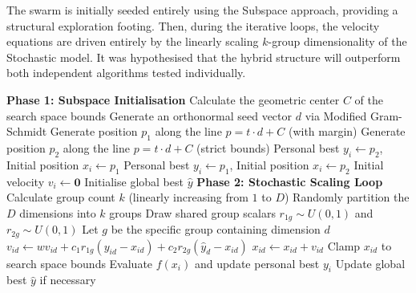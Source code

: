 \documentclass[conference]{IEEEtran}
\begin{document}
    The swarm is initially seeded entirely using the Subspace approach, providing a structural exploration footing. Then, during the iterative 
    loops, the velocity equations are driven entirely by the linearly scaling $k$-group dimensionality of the Stochastic model. It was hypothesised that 
    the hybrid structure will outperform both independent algorithms tested individually. 

    \begin{algorithm}
    \caption{Hybrid Particle Swarm Optimisation (Subspace Initialisation + Stochastic Scaling)}
    \label{alg:hybrid_pso}
    \begin{algorithmic}[1]
    \STATE \textbf{Phase 1: Subspace Initialisation}
    \STATE Calculate the geometric center $C$ of the search space bounds
    \STATE Generate an orthonormal seed vector $d$ via Modified Gram-Schmidt
        \STATE Generate position $p_1$ along the line $p = t \cdot d + C$ (with margin)
        \STATE Generate position $p_2$ along the line $p = t \cdot d + C$ (strict bounds)
            \STATE Personal best $y_i \gets p_2$, Initial position $x_i \gets p_1$
        \ELSE
            \STATE Personal best $y_i \gets p_1$, Initial position $x_i \gets p_2$
        \ENDIF
        \STATE Initial velocity $v_i \gets \mathbf{0}$ 
    \ENDFOR
    \STATE Initialise global best $\hat{y}$
    \STATE
    \STATE \textbf{Phase 2: Stochastic Scaling Loop}
        \STATE Calculate group count $k$ (linearly increasing from $1$ to $D$)
        \STATE Randomly partition the $D$ dimensions into $k$ groups
            \STATE Draw shared group scalars $r_{1g} \sim U(0,1)$ and $r_{2g} \sim U(0,1)$
        \ENDFOR
                \STATE Let $g$ be the specific group containing dimension $d$
                \STATE $v_{id} \gets w v_{id} + c_1 r_{1g} (y_{id} - x_{id}) + c_2 r_{2g} (\hat{y}_d - x_{id})$
                \STATE $x_{id} \gets x_{id} + v_{id}$
                \STATE Clamp $x_{id}$ to search space bounds
            \ENDFOR
            \STATE Evaluate $f(x_i)$ and update personal best $y_i$
        \ENDFOR
        \STATE Update global best $\hat{y}$ if necessary
    \ENDFOR
    \end{algorithmic}
    \end{algorithm}
\end{document}
